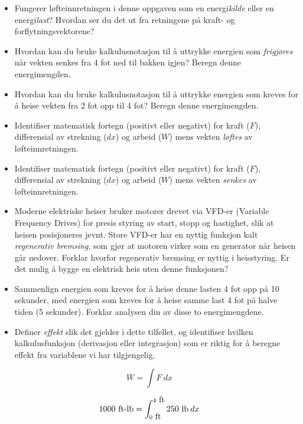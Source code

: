 \begin{itemize}
\item{} Fungerer løfteinnretningen i denne oppgaven som en energi{\it kilde} eller en energi{\it last}? Hvordan ser du det ut fra retningene på kraft- og forflytningsvektorene? 
\item{} Hvordan kan du bruke kalkulusnotasjon til å uttrykke energien som {\it frigjøres} når vekten senkes fra 4 fot ned til bakken igjen? Beregn denne energimengden.
\item{} Hvordan kan du bruke kalkulusnotasjon til å uttrykke energien som kreves for å heise vekten fra 2 fot opp til 4 fot? Beregn denne energimengden.
\item{} Identifiser matematisk fortegn (positivt eller negativt) for kraft ($F$), differensial av strekning ($dx$) og arbeid ($W$) mens vekten {\it løftes} av løfteinnretningen.
\item{} Identifiser matematisk fortegn (positivt eller negativt) for kraft ($F$), differensial av strekning ($dx$) og arbeid ($W$) mens vekten {\it senkes} av løfteinnretningen.
\item{} Moderne elektriske heiser bruker motorer drevet via VFD-er (Variable Frequency Drives) for presis styring av start, stopp og hastighet, slik at heisen posisjoneres jevnt. Store VFD-er har en nyttig funksjon kalt {\it regenerativ bremsing}, som gjør at motoren virker som en generator når heisen går nedover. Forklar hvorfor regenerativ bremsing er nyttig i heisstyring. Er det mulig å bygge en elektrisk heis uten denne funksjonen?
\item{} Sammenlign energien som kreves for å heise denne lasten 4 fot opp på 10 sekunder, med energien som kreves for å heise samme last 4 fot på halve tiden (5 sekunder). Forklar analysen din av disse to energimengdene.
\item{} Definer {\it effekt} slik det gjelder i dette tilfellet, og identifiser hvilken kalkulusfunksjon (derivasjon eller integrasjon) som er riktig for å beregne effekt fra variablene vi har tilgjengelig.
\end{itemize}







$$W = \int F \> dx$$

$$1000 \hbox{ ft-lb} = \int_{0\hbox{ ft}}^{4\hbox{ ft}} 250 \hbox{ lb} \> dx$$










